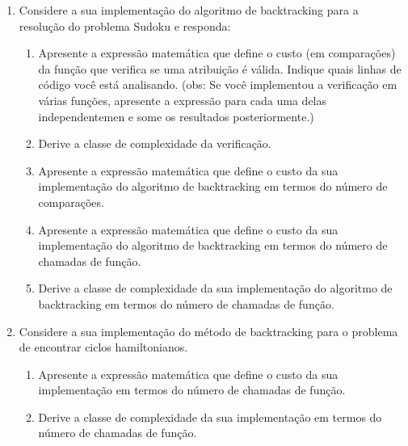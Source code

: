 \documentclass{article}
\begin{document}
\begin{enumerate}
    \item Considere a sua implementação do algoritmo de backtracking para a resolução do problema Sudoku e responda:

    \begin{enumerate}
        \item Apresente a expressão matemática que define o custo (em comparações) da função que verifica se uma atribuição é válida. Indique quais linhas de código você está analisando. (obs: Se você implementou a verificação em várias funções, apresente a expressão para cada uma delas independentemen e some os resultados posteriormente.)
        \item Derive a classe de complexidade da verificação.
        \item Apresente a expressão matemática que define o custo da sua implementação do algoritmo de backtracking em termos do número de comparações.
        \item Apresente a expressão matemática que define o custo da sua implementação do algoritmo de backtracking em termos do número de chamadas de função.
        \item Derive a classe de complexidade da sua implementação do algoritmo de backtracking em termos do número de chamadas de função.
    \end{enumerate}

    \item Considere a sua implementação do método de backtracking para o problema de encontrar ciclos hamiltonianos.
    
    \begin{enumerate}
        \item Apresente a expressão matemática que define o custo da sua implementação em termos do número de chamadas de função.
        \item Derive a classe de complexidade da sua implementação em termos do número de chamadas de função.
    \end{enumerate}

\end{enumerate}


%
%
\end{document}
